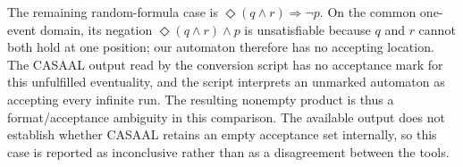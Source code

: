 The remaining random-formula case is $\Diamond(q\land r)\Rightarrow\neg p$.
On the common one-event domain, its negation
$\Diamond(q\land r)\land p$ is unsatisfiable because $q$ and $r$ cannot both
hold at one position; our automaton therefore has no accepting location. The
CASAAL output read by the conversion script has no acceptance mark for this
unfulfilled eventuality, and the script interprets an unmarked automaton as
accepting every infinite run. The resulting nonempty product is thus a
format/acceptance ambiguity in this comparison. The available output does not
establish whether CASAAL retains an empty acceptance set internally, so this
case is reported as inconclusive rather than as a disagreement between the
tools.
